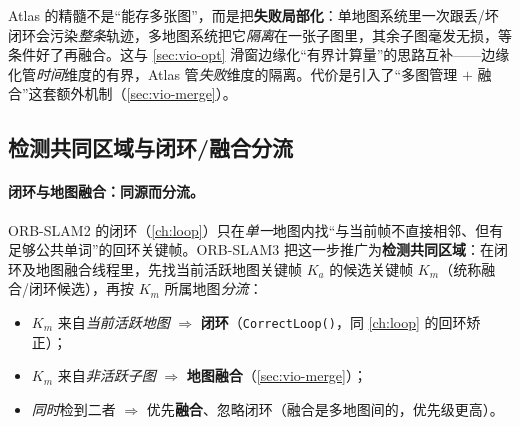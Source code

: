 \begin{insight}
Atlas 的精髓不是“能存多张图”，而是把\textbf{失败局部化}：单地图系统里一次跟丢/坏闭环会污染\emph{整条}轨迹，多地图系统把它\emph{隔离}在一张子图里，其余子图毫发无损，等条件好了再融合。这与 \cref{sec:vio-opt} 滑窗边缘化“有界计算量”的思路互补——边缘化管\emph{时间}维度的有界，Atlas 管\emph{失败}维度的隔离。代价是引入了“多图管理 $+$ 融合”这套额外机制（\cref{sec:vio-merge}）。
\end{insight}

\subsection{检测共同区域与闭环/融合分流}
\label{sec:vio-merge-detect}

\paragraph{闭环与地图融合：同源而分流。}
ORB-SLAM2 的闭环（\cref{ch:loop}）只在\emph{单一}地图内找“与当前帧不直接相邻、但有足够公共单词”的回环关键帧。ORB-SLAM3 把这一步推广为\textbf{检测共同区域}\cite{campos2021orbslam3}：在闭环及地图融合线程里，先找当前活跃地图关键帧 $K_a$ 的候选关键帧 $K_m$（统称融合/闭环候选），再按 $K_m$ 所属地图\emph{分流}：
\begin{itemize}
  \item $K_m$ 来自\emph{当前活跃地图} $\Rightarrow$ \textbf{闭环}（\texttt{CorrectLoop()}，同 \cref{ch:loop} 的回环矫正）；
  \item $K_m$ 来自\emph{非活跃子图} $\Rightarrow$ \textbf{地图融合}（\cref{sec:vio-merge}）；
  \item \emph{同时}检到二者 $\Rightarrow$ 优先\textbf{融合}、忽略闭环（融合是多地图间的，优先级更高）。
\end{itemize}

